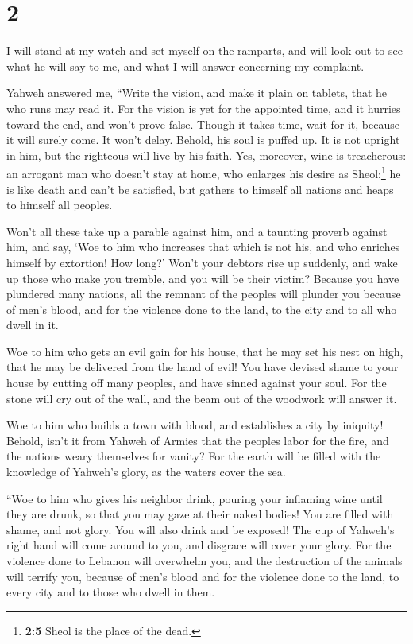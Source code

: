 \hypertarget{section-1}{%
\section{2}\label{section-1}}

 I will stand at my watch and set myself on the ramparts,
and will look out to see what he will say to me, and what I will answer
concerning my complaint.

 Yahweh answered me, ``Write the vision, and make it plain
on tablets, that he who runs may read it.  For the vision
is yet for the appointed time, and it hurries toward the end, and won't
prove false. Though it takes time, wait for it, because it will surely
come. It won't delay.  Behold, his soul is puffed up. It
is not upright in him, but the righteous will live by his faith.
 Yes, moreover, wine is treacherous: an arrogant man who
doesn't stay at home, who enlarges his desire as Sheol;\footnote{\textbf{2:5}
  Sheol is the place of the dead.} he is like death and can't be
satisfied, but gathers to himself all nations and heaps to himself all
peoples.

 Won't all these take up a parable against him, and a
taunting proverb against him, and say, `Woe to him who increases that
which is not his, and who enriches himself by extortion! How long?'
 Won't your debtors rise up suddenly, and wake up those
who make you tremble, and you will be their victim? 
Because you have plundered many nations, all the remnant of the peoples
will plunder you because of men's blood, and for the violence done to
the land, to the city and to all who dwell in it.

 Woe to him who gets an evil gain for his house, that he
may set his nest on high, that he may be delivered from the hand of
evil!  You have devised shame to your house by cutting
off many peoples, and have sinned against your soul.  For
the stone will cry out of the wall, and the beam out of the woodwork
will answer it.

 Woe to him who builds a town with blood, and establishes
a city by iniquity!  Behold, isn't it from Yahweh of
Armies that the peoples labor for the fire, and the nations weary
themselves for vanity?  For the earth will be filled with
the knowledge of Yahweh's glory, as the waters cover the sea.

 ``Woe to him who gives his neighbor drink, pouring your
inflaming wine until they are drunk, so that you may gaze at their naked
bodies!  You are filled with shame, and not glory. You
will also drink and be exposed! The cup of Yahweh's right hand will come
around to you, and disgrace will cover your glory.  For
the violence done to Lebanon will overwhelm you, and the destruction of
the animals will terrify you, because of men's blood and for the
violence done to the land, to every city and to those who dwell in them.

